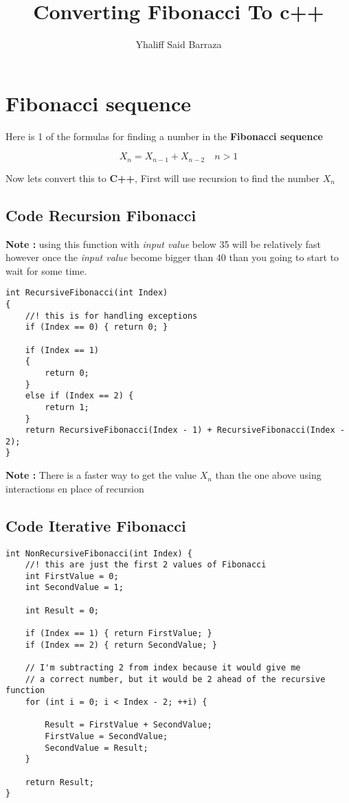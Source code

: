\documentclass{article}
\author{Yhaliff Said Barraza}
\title{Converting Fibonacci To c++}
\begin{document}
\maketitle

\section{Fibonacci sequence}
Here is 1 of the formulas for finding a number in the \textbf{Fibonacci sequence}  

$$ X_n = X_{n-1} + X_{n-2 } \quad n > 1$$

Now lets convert this to \textbf{C++}, First will use recursion to find the number $X_n$


\subsection{Code Recursion Fibonacci}

\textbf{Note :} using this function with \textit{input value} below 35 will be relatively fast however once the \textit{input value} become bigger than 40 than you going to start to wait for some time.
\begin{lstlisting}
int RecursiveFibonacci(int Index)
{
	//! this is for handling exceptions
	if (Index == 0) { return 0; }

	if (Index == 1)
	{
		return 0;
	}
	else if (Index == 2) {
		return 1;
	}
	return RecursiveFibonacci(Index - 1) + RecursiveFibonacci(Index - 2);
}
\end{lstlisting}

\textbf{Note :} There is a faster way to get the value $X_n$ than the one above using interactions en place of recursion

\subsection{Code Iterative Fibonacci }

\begin{lstlisting} 
int NonRecursiveFibonacci(int Index) {
	//! this are just the first 2 values of Fibonacci
	int FirstValue = 0;
	int SecondValue = 1;

	int Result = 0;

	if (Index == 1) { return FirstValue; }
	if (Index == 2) { return SecondValue; }

	// I'm subtracting 2 from index because it would give me 
	// a correct number, but it would be 2 ahead of the recursive function
	for (int i = 0; i < Index - 2; ++i) {

		Result = FirstValue + SecondValue;
		FirstValue = SecondValue;
		SecondValue = Result;
	}

	return Result;
}
\end{lstlisting}
\end{document}
